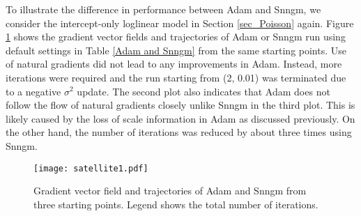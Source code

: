 \documentclass{statsoc}
\begin{document}
To illustrate the difference in performance between Adam and Snngm, we consider the intercept-only loglinear model in Section \ref{sec_Poisson} again. Figure \ref{Fig c} shows the gradient vector fields and trajectories of Adam or Snngm run using default settings in Table \ref{Adam and Snngm} from the same starting points. Use of natural gradients did not lead to any improvements in Adam. Instead, more iterations were required and the run starting from (2, 0.01) was terminated due to a negative $\sigma^2$ update. The second plot also indicates that Adam does not follow the flow of natural gradients closely unlike Snngm in the third plot. This is likely caused by the loss of scale information in Adam as discussed previously. On the other hand, the number of iterations was reduced by about three times using Snngm.

\begin{figure}[htb!]
\centering
\texttt{[image: satellite1.pdf]}
\caption{Gradient vector field and trajectories of Adam and Snngm from three starting points. Legend shows the total number of iterations.}
\label{Fig c}
\end{figure}
\end{document}
